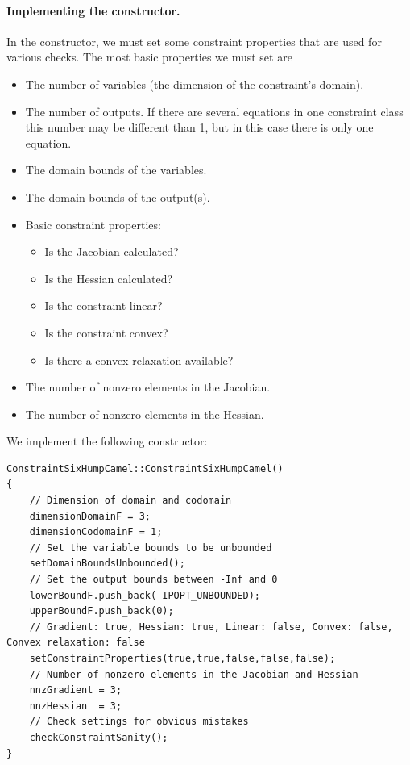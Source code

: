 \paragraph{Implementing the constructor.} In the constructor, we must set some constraint properties that are used for various checks. The most basic properties we must set are
\begin{itemize}
\item
The number of variables (the dimension of the constraint's domain).
\item
The number of outputs. If there are several equations in one constraint class this number may be different than 1, but in this case there is only one equation.
\item
The domain bounds of the variables.
\item
The domain bounds of the output(s).
\item
Basic constraint properties:
\begin{itemize}
\item Is the Jacobian calculated?
\item Is the Hessian calculated?
\item Is the constraint linear?
\item Is the constraint convex?
\item Is there a convex relaxation available?
\end{itemize}
\item
The number of nonzero elements in the Jacobian.
\item
The number of nonzero elements in the Hessian.
\end{itemize}
We implement the following constructor:
\begin{lstlisting}
ConstraintSixHumpCamel::ConstraintSixHumpCamel()
{
	// Dimension of domain and codomain 
	dimensionDomainF = 3;
	dimensionCodomainF = 1;
	// Set the variable bounds to be unbounded
	setDomainBoundsUnbounded();
	// Set the output bounds between -Inf and 0
	lowerBoundF.push_back(-IPOPT_UNBOUNDED);
	upperBoundF.push_back(0);
	// Gradient: true, Hessian: true, Linear: false, Convex: false, Convex relaxation: false
	setConstraintProperties(true,true,false,false,false);
	// Number of nonzero elements in the Jacobian and Hessian
	nnzGradient = 3;
	nnzHessian  = 3;
	// Check settings for obvious mistakes
	checkConstraintSanity();
}
\end{lstlisting}

